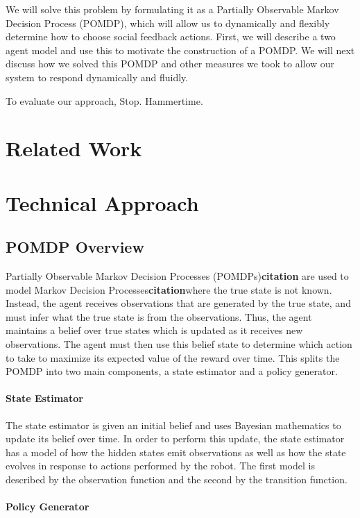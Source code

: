 \documentclass{article}
\begin{document}
We will solve this problem by formulating it as a Partially Observable Markov Decision Process (POMDP), which will allow us to dynamically and flexibly determine how to choose social feedback actions. First, we will describe a two agent model and use this to motivate the construction of a POMDP. We will next discuss how we solved this POMDP and other measures we took to allow our system to respond dynamically and fluidly. 

To evaluate our approach, Stop. Hammertime. 


\section{Related Work}

\section{Technical Approach}

\subsection{POMDP Overview}

Partially Observable Markov Decision Processes (POMDPs)\textbf{citation} are used to model Markov Decision Processes\textbf{citation}where the true state is not known. Instead, the agent receives observations that are generated by the true state, and must infer what the true state is from the observations. Thus, the agent maintains a belief over true states which is updated as it receives new observations. The agent must then use this belief state to determine which action to take to maximize its expected value of the reward over time. This splits the POMDP into two main components, a state estimator and a policy generator. 

\paragraph{State Estimator}

The state estimator is given an initial belief and uses Bayesian mathematics to update its belief over time. In order to perform this update, the state estimator has a model of how the hidden states emit observations as well as how the state evolves in response to actions performed by the robot. The first model is described by the observation function and the second by the transition function. 

\paragraph{Policy Generator}
\end{document}
